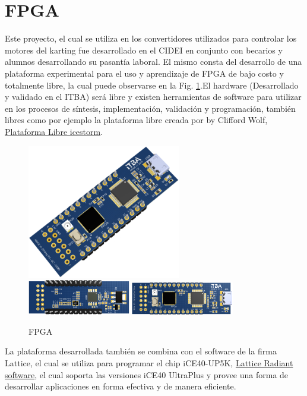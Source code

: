 \documentclass[a4paper]{article}
\begin{document}
\section{FPGA}
Este proyecto, el cual se utiliza en los convertidores utilizados para controlar los motores del karting fue desarrollado en el CIDEI en conjunto con becarios y alumnos desarrollando su pasantía laboral.
El mismo consta del desarrollo de una plataforma experimental para el uso y aprendizaje de FPGA de bajo costo y totalmente libre, la cual puede observarse en la Fig. \ref{fig:fpga}.El hardware (Desarrollado y validado en el ITBA) será libre y existen herramientas de software para utilizar en los procesos de síntesis, implementación, validación y programación, también libres como por ejemplo la plataforma libre creada por by Clifford Wolf, \href{http://www.clifford.at/icestorm/}{Plataforma Libre icestorm}.
%
\begin{figure}[h]
    \centering
    \includegraphics[width=0.6\textwidth]{figs/fpga1.png}
    \includegraphics[width=0.4\textwidth]{figs/fpga2.png}
    \includegraphics[width=0.4\textwidth]{figs/fpga3.png}
    \caption{FPGA}
    \label{fig:fpga}
\end{figure}

La plataforma desarrollada también se combina con el software de la firma Lattice, el cual se utiliza para programar el chip iCE40-UP5K,  \href{http://www.latticesemi.com/Products/DesignSoftwareAndIP/FPGAandLDS/Radiant}{Lattice Radiant software}, el cual soporta las versiones iCE40 UltraPlus y provee una forma de desarrollar aplicaciones en forma efectiva y de manera eficiente. 
\end{document}
